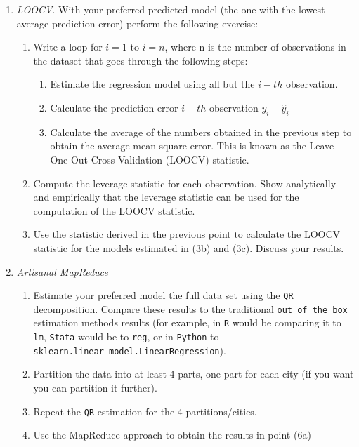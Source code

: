 \documentclass[12pt,onecolumn]{article}
\begin{document}
\begin{enumerate}
  
  \item {\it LOOCV}. With your preferred predicted model (the one with the lowest average prediction error) perform the following exercise:
  \begin{enumerate}
      \item Write a loop for $i = 1$ to $i = n$, where n is the number of observations in the dataset that goes through the following steps:
  \begin{enumerate}
      \item Estimate the regression model using all but the $i-th$ observation.
      \item Calculate the prediction error $i-th$ observation $y_i-\hat y_i$
      \item Calculate the average of the numbers obtained in the previous step to obtain the average mean square error. This is known as the Leave-One-Out Cross-Validation (LOOCV) statistic.
    \end{enumerate}
        \item Compute the leverage statistic for each observation. Show analytically and empirically that the leverage statistic can be used for the computation of the LOOCV statistic.
        \item Use the statistic derived in the previous point to calculate the LOOCV statistic for the models estimated in (3b) and (3c). Discuss your results.
  \end{enumerate}

  \item {\it Artisanal MapReduce}
  \begin{enumerate}
    \item Estimate your preferred model the full data set using the \texttt{QR} decomposition. Compare these results to the traditional \texttt{out of the box} estimation methods results (for example, in \texttt{R} would be comparing it to \texttt{lm}, \texttt{Stata} would be to \texttt{reg}, or in \texttt{Python} to \texttt{sklearn.linear\_model.LinearRegression}).
    \item Partition the data into at least 4 parts, one part for each city (if you want you can partition it further).
    \item Repeat the \texttt{QR} estimation for the 4 partitions/cities.
    \item Use the MapReduce approach to obtain the results in point (6a)
  \end{enumerate}
  
\end{enumerate}
\end{document}
